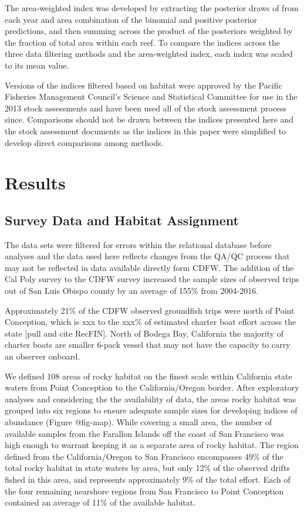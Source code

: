 \documentclass[
  authoryear,
  preprint,
  3p]{elsarticle}
\begin{document}
The area-weighted index was developed by extracting the posterior draws
of from each year and area combination of the binomial and positive
posterior predictions, and then summing across the product of the
posteriors weighted by the fraction of total area within each reef. To
compare the indices across the three data filtering methods and the
area-weighted index, each index was scaled to its mean value.

Versions of the indices filtered based on habitat were approved by the
Pacific Fisheries Management Council's Science and Statistical Committee
for use in the 2013 stock assessments and have been used all of the
stock assessment process since. Comparisons should not be drawn between
the indices presented here and the stock assessment documents as the
indices in this paper were simplified to develop direct comparisons
among methods.

\hypertarget{results}{%
\section{Results}\label{results}}

\hypertarget{survey-data-and-habitat-assignment}{%
\subsection{Survey Data and Habitat
Assignment}\label{survey-data-and-habitat-assignment}}

The data sets were filtered for errors within the relational database
before analyses and the data used here reflects changes from the QA/QC
process that may not be reflected in data available directly form CDFW.
The addition of the Cal Poly survey to the CDFW survey increased the
sample sizes of observed trips out of San Luis Obispo county by an
average of 155\% from 2004-2016.

Approximately 21\% of the CDFW observed groundfish trips were north of
Point Conception, which is xxx to the xxx\% of estimated charter boat
effort across the state {[}pull and cite RecFIN{]}. North of Bodega Bay,
California the majority of charter boats are smaller 6-pack vessel that
may not have the capacity to carry an observer onboard.

We defined 108 areas of rocky habitat on the finest scale within
California state waters from Point Conception to the California/Oregon
border. After exploratory analyses and considering the the availability
of data, the areas rocky habitat was grouped into six regions to ensure
adequate sample sizes for developing indices of abundance (Figure
@fig-map). While covering a small area, the number of available samples
from the Farallon Islands off the coast of San Francisco was high enough
to warrant keeping it as a separate area of rocky habitat. The region
defined from the California/Oregon to San Francisco encompasses 49\% of
the total rocky habitat in state waters by area, but only 12\% of the
observed drifts fished in this area, and represents approximately 9\% of
the total effort. Each of the four remaining nearshore regions from San
Francisco to Point Conception contained an average of 11\% of the
available habitat.
\end{document}
